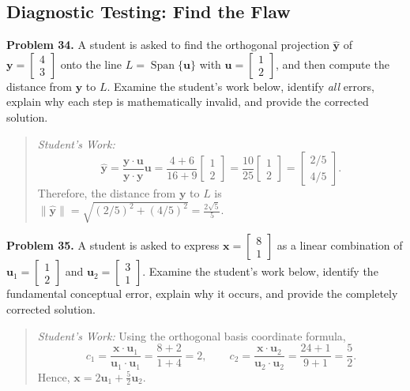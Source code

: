 \documentclass[11pt, letterpaper]{article}
\theoremstyle{definition}
\theoremstyle{remark}
\begin{document}
\subsection{Diagnostic Testing: Find the Flaw}

\textbf{Problem 34.} A student is asked to find the orthogonal projection $\hat{\mathbf{y}}$ of $\mathbf{y} = \begin{bmatrix} 4 \\ 3 \end{bmatrix}$ onto the line $L = \operatorname{Span}\{\mathbf{u}\}$ with $\mathbf{u} = \begin{bmatrix} 1 \\ 2 \end{bmatrix}$, and then compute the distance from $\mathbf{y}$ to $L$. Examine the student's work below, identify \textit{all} errors, explain why each step is mathematically invalid, and provide the corrected solution.
\begin{quote}
\textit{Student's Work:}
\[
\hat{\mathbf{y}} = \frac{\mathbf{y} \cdot \mathbf{u}}{\mathbf{y} \cdot \mathbf{y}}\mathbf{u} = \frac{4 + 6}{16 + 9}\begin{bmatrix} 1 \\ 2 \end{bmatrix} = \frac{10}{25}\begin{bmatrix} 1 \\ 2 \end{bmatrix} = \begin{bmatrix} 2/5 \\ 4/5 \end{bmatrix}.
\]
Therefore, the distance from $\mathbf{y}$ to $L$ is $\|\hat{\mathbf{y}}\| = \sqrt{(2/5)^2 + (4/5)^2} = \frac{2\sqrt{5}}{5}$.
\end{quote}

\textbf{Problem 35.} A student is asked to express $\mathbf{x} = \begin{bmatrix} 8 \\ 1 \end{bmatrix}$ as a linear combination of $\mathbf{u}_1 = \begin{bmatrix} 1 \\ 2 \end{bmatrix}$ and $\mathbf{u}_2 = \begin{bmatrix} 3 \\ 1 \end{bmatrix}$. Examine the student's work below, identify the fundamental conceptual error, explain why it occurs, and provide the completely corrected solution.
\begin{quote}
\textit{Student's Work:} Using the orthogonal basis coordinate formula,
\[
c_1 = \frac{\mathbf{x} \cdot \mathbf{u}_1}{\mathbf{u}_1 \cdot \mathbf{u}_1} = \frac{8 + 2}{1 + 4} = 2, \qquad
c_2 = \frac{\mathbf{x} \cdot \mathbf{u}_2}{\mathbf{u}_2 \cdot \mathbf{u}_2} = \frac{24 + 1}{9 + 1} = \frac{5}{2}.
\]
Hence, $\mathbf{x} = 2\mathbf{u}_1 + \frac{5}{2}\mathbf{u}_2$.
\end{quote}
\end{document}
